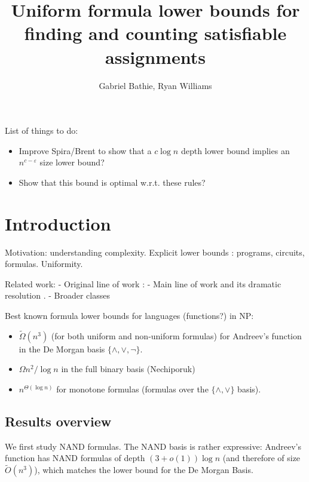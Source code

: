 \documentclass[a4paper, 12pt]{article}
\title{Uniform formula lower bounds for finding and counting satisfiable assignments}
\author{Gabriel Bathie, Ryan Williams}
\theoremstyle{plain}
\theoremstyle{definition}
\theoremstyle{remark}
\newcommand{\eps}{\varepsilon}%
\newcommand{\Omegat}[1]{\widetilde{\Omega}\left( #1 \right)}%
\newcommand{\Ot}[1]{\widetilde{O}\left( #1 \right)}%
\newcommand{\NAND}{\textsf{NAND}}%
\begin{document}
\maketitle

\begin{abstract}
\end{abstract}


List of things to do:
\begin{itemize}
	\item Improve Spira/Brent to show that a $c \log n$ depth 
	lower bound implies an $n^{c-\eps}$ size lower bound?
	\item Show that this bound is optimal w.r.t. these rules?
\end{itemize}

\section{Introduction}

Motivation: understanding complexity. Explicit lower bounds : programs, circuits, formulas.
Uniformity.

Related work:
- Original line of work : \cite{fortnow2000time,fortnow2005time}
- Main line of work \cite{williams2006inductive,williams2007time,williams2013alternation} and its dramatic resolution \cite{buss2015limits}.
- Broader classes \cite{mudigonda2020time}

Best known formula lower bounds for languages (functions?) in NP: 
\begin{itemize}
	\item $\Omegat{n^3}$ (for both uniform and non-uniform formulas) for Andreev's function \cite{hastad1998shrinkage} in the De Morgan basis $\{\wedge, \vee, \neg\}$.
	\item $\Omega{n^2/\log n}$ in the full binary basis (Nechiporuk)
	\item $n^{\Theta(\log n)}$ for monotone formulas (formulas over the $\{\wedge, \vee\}$ basis).
\end{itemize}

\subsection{Results overview}

We first study \NAND{} formulas. 
The \NAND{} basis is rather expressive: Andreev's function has \NAND{} formulas of depth $(3+o(1)) \log n$ (and therefore of size $\Ot{n^3}$), which matches the lower bound for the De Morgan Basis.
\end{document}
